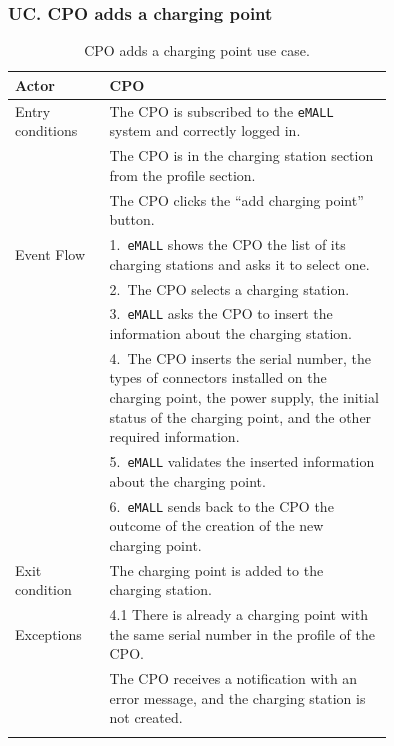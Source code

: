 \subsubsection*{UC\cuc . CPO adds a charging point}
\begin{center}
    \begin{longtable}{lp{0.75\linewidth}}
        \hline
        Actor            & CPO                                                                                             \\
        \hline
        Entry conditions & The CPO is subscribed to the \verb|eMALL| system and correctly logged in.                              \\
        & The CPO is in the charging station section from the profile section.                            \\
        & The CPO clicks the “add charging point” button.                                                 \\
        \hline
        Event Flow       & 1.\ \verb|eMALL| shows the CPO the list of its charging stations and asks it to select one.            \\
        & 2.\ The CPO selects a charging station.                                                         \\
        & 3.\ \verb|eMALL| asks the CPO to insert the information about the charging station.                    \\
        & 4.\ The CPO inserts the serial number, the types of connectors installed on the charging point, the power supply,
        the initial status of the charging point, and the other required information. \\
        & 5.\ \verb|eMALL| validates the inserted information about the charging point.                          \\
        & 6.\ \verb|eMALL| sends back to the CPO the outcome of the creation of the new charging point.          \\
        \hline
        Exit condition   & The charging point is added to the charging station.                                            \\
        \hline
        Exceptions       & 4.1 There is already a charging point with the same serial number in the profile of the CPO.    \\
        & The CPO receives a notification with an error message, and the charging station is not created. \\
        \hline
        \caption{CPO adds a charging point use case.}
        \label{tab: CPO_adds_charging_point_use_case}
    \end{longtable}


\end{center}

